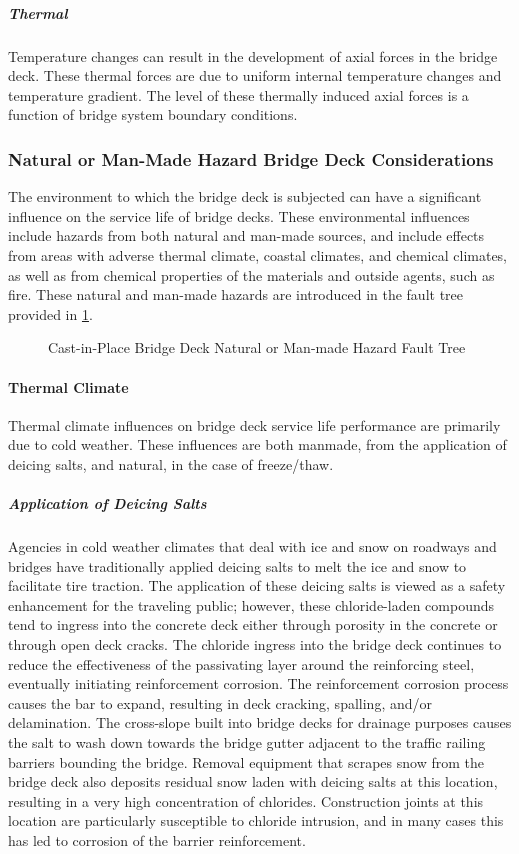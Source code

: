 \subparagraph*{Thermal}
Temperature changes can result in the development of axial forces in the bridge deck. These thermal forces are due to uniform internal temperature changes and temperature gradient. The level of these thermally induced axial forces is a function of bridge system boundary conditions.


\subsubsection{Natural or Man-Made Hazard Bridge Deck Considerations}
The environment to which the bridge deck is subjected can have a significant influence on the service life of bridge decks. These environmental influences include hazards from both natural and man-made sources, and include effects from areas with adverse thermal climate, coastal climates, and chemical climates, as well as from chemical properties of the materials and outside agents, such as fire. These natural and man-made hazards are introduced in the fault tree provided in \cref{fig:fault-tree-cip-deck-hazard}.

\begin{figure}
  \caption{Cast-in-Place Bridge Deck Natural or Man-made Hazard Fault Tree}
  \label{fig:fault-tree-cip-deck-hazard}
\end{figure}

\paragraph{Thermal Climate}
Thermal climate influences on bridge deck service life performance are primarily due to cold weather. These influences are both manmade, from the application of deicing salts, and natural, in the case of freeze/thaw.

\subparagraph*{Application of Deicing Salts}
Agencies in cold weather climates that deal with ice and snow on roadways and bridges have traditionally applied deicing salts to melt the ice and snow to facilitate tire traction. The application of these deicing salts is viewed as a safety enhancement for the traveling public; however, these chloride-laden compounds tend to ingress into the concrete deck either through porosity in the concrete or through open deck cracks. The chloride ingress into the bridge deck continues to reduce the effectiveness of the passivating layer around the reinforcing steel, eventually initiating reinforcement corrosion. The reinforcement corrosion process causes the bar to expand, resulting in deck cracking, spalling, and/or delamination. The cross-slope built into bridge decks for drainage purposes causes the salt to wash down towards the bridge gutter adjacent to the traffic railing barriers bounding the bridge. Removal equipment that scrapes snow from the bridge deck also deposits residual snow laden with deicing salts at this location, resulting in a very high concentration of chlorides. Construction joints at this location are particularly susceptible to chloride intrusion, and in many cases this has led to corrosion of the barrier reinforcement.

